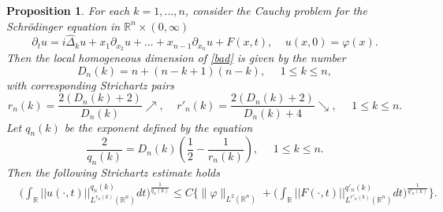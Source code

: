 \documentclass[11pt,letter]{amsart}
\def \R {\mathbb{R}}
\def \vf{\varphi}
\newcommand{\Rn}{\mathbb R^n}
\newcommand{\p}{\partial}
\numberwithin{equation}{section}
\newtheorem{proposition}[theorem]{Proposition}
\numberwithin{equation}{section}
\begin{document}
\begin{proposition}\label{E:fan} For each $k=1,...,n$, consider the Cauchy problem for the Schr\"odinger equation in $\Rn\times (0,\infty)$  
\begin{equation}\label{bad}
\p_t u = i \hat \Delta_k u + x_1 \p_{x_2} u + . . . + x_{n-1} \p_{x_n} u + F(x,t),\ \ \ \ \ u(x,0) = \vf(x).
\end{equation}
Then the local homogeneous dimension of \eqref{bad} is given by the number
\begin{equation}\label{Dk}
D_n(k) = n + (n-k+1)(n-k),\ \ \ \ \ \ 1\le k\le n,
\end{equation}
with corresponding \emph{Strichartz pairs} 
\begin{equation}\label{stricouples}
r_n(k) = \frac{2(D_n(k)+2)}{D_n(k)} \nearrow,\ \ \ \ \ r'_n(k) = \frac{2(D_n(k)+2)}{D_n(k)+4}\searrow,\ \ \ \ \ \ 1\le k\le n.
\end{equation}
Let $q_n(k)$ be the exponent defined by the equation
\begin{equation}\label{kad}
\frac{2}{q_n(k)} = D_n(k)\left(\frac 12 - \frac{1}{r_n(k)}\right),\ \ \ \ \ \ 1\le k\le n.
\end{equation}
Then the following Strichartz estimate holds
\begin{align}\label{stribad}
& \bigg(\int_\R ||u(\cdot,t)||^{q_n(k)}_{L^{r_n(k)}(\Rn)} dt \bigg)^{\frac 1{q_n(k)}} \le C \bigg\{\|\vf\|_{L^2(\Rn)} + \bigg(\int_\R ||F(\cdot,t)||^{q'_n(k)}_{L^{r'_n(k)}(\Rn)} dt \bigg)^{\frac 1{q'_n(k)}}\bigg\}.
\end{align}
\end{proposition}
\end{document}
